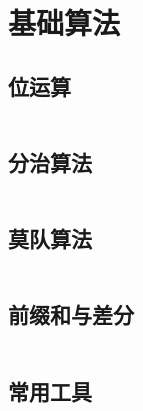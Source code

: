 \chapter{基础算法}

\section{位运算}

\inputminted{cpp}{code/Basic/Bits.cpp}

\section{分治算法}

\inputminted{cpp}{code/Basic/DivideConquer.cpp}

\section{莫队算法}

\inputminted{cpp}{code/Basic/MoDui.cpp}

\section{前缀和与差分}

\inputminted{cpp}{code/Basic/PrefixAndDiff.cpp}

\section{常用工具}

\inputminted{cpp}{code/Basic/Tool.cpp}
